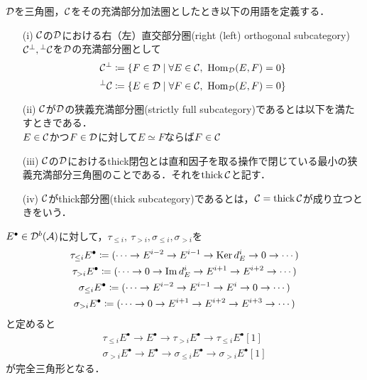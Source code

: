 \begin{defn}
	${\mathcal D}$を三角圏，${\mathcal C}$をその充満部分加法圏としたとき以下の用語を定義する．
	\begin{itemize}
		\item[(i)]
			${\mathcal C}$の${\mathcal D}$における右（左）直交部分圏(right (left) orthogonal subcategory)${\mathcal C}^\perp,{}^\perp{\mathcal C}$を${\mathcal D}$の充満部分圏として
			\[\C^\perp\coloneq \{F\in\D\mid\forall E\in\C,\ \Hom_{\D}(E,F)=0\}\]
			\[{}^\perp\C\coloneq \{E\in\D\mid\forall F\in\C,\ \Hom_{\D}(E,F)=0\}\]
		\item[(ii)]
			${\mathcal C}$が${\mathcal D}$の狭義充満部分圏(strictly full subcategory)であるとは以下を満たすときである．\\
			$E\in{\mathcal C}$かつ$F\in{\mathcal D}$に対して$E\simeq F$ならば$F\in{\mathcal C}$
		\item[(iii)]
			${\mathcal C}$の${\mathcal D}$におけるthick閉包とは直和因子を取る操作で閉じている最小の狭義充満部分三角圏のことである．それを$\operatorname{\mathrm{thick}} {\mathcal C}$と記す．
		\item[(iv)]
			${\mathcal C}$がthick部分圏(thick subcategory)であるとは，${\mathcal C} = \operatorname{\mathrm{thick}}{\mathcal C}$が成り立つときをいう．
	\end{itemize}
\end{defn}
$E^\bullet\in{\mathcal D}^b({\mathcal A})$に対して，$\tau_{\le i},\ \tau_{> i},\sigma_{\le i}, \sigma_{> i}$を
\begin{gather*}
	\tau_{\le i}E^\bullet\coloneq (\cdots \rightarrow E^{i-2}\rightarrow E^{i-1}\rightarrow \operatorname{Ker} d_E^i\rightarrow 0\rightarrow \cdots)\\
	\tau_{> i}E^\bullet\coloneq (\cdots \rightarrow 0\rightarrow \Im d_E^i\rightarrow E^{i+1}\rightarrow E^{i+2}\rightarrow \cdots)\\
	\sigma_{\le i}E^\bullet\coloneq (\cdots \rightarrow E^{i-2}\rightarrow E^{i-1}\rightarrow E^i\rightarrow 0\rightarrow \cdots)\\
	\sigma_{> i}E^\bullet\coloneq (\cdots \rightarrow 0\rightarrow E^{i+1}\rightarrow E^{i+2}\rightarrow E^{i+3}\rightarrow \cdots)
\end{gather*}
と定めると
\begin{gather}
	\tau_{\le i}E^\bullet\rightarrow E^\bullet \rightarrow\tau_{>i}E^\bullet\rightarrow \tau_{\le i}E^\bullet[1]\label{canonical}\\
	\sigma_{>i}E^\bullet\rightarrow E^\bullet \rightarrow\sigma_{\le i}E^\bullet\rightarrow \sigma_{> i}E^\bullet[1]\label{stupid}
\end{gather}
が完全三角形となる．

